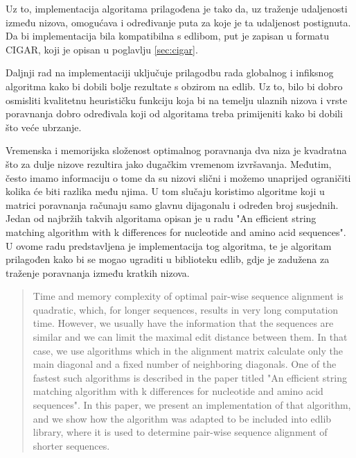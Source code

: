 \documentclass[times, utf8, zavrsni]{fer}
\begin{document}
Uz to, implementacija algoritama prilagođena je tako da, uz traženje udaljenosti između nizova, omogućava i određivanje puta za koje je ta udaljenost postignuta. Da bi implementacija bila kompatibilna s edlibom, put je zapisan u formatu CIGAR, koji je opisan u poglavlju \ref{sec:cigar}.

Daljnji rad na implementaciji uključuje prilagodbu rada globalnog i infiksnog algoritma kako bi dobili bolje rezultate s obzirom na edlib. Uz to, bilo bi dobro osmisliti kvalitetnu heurističku funkciju koja bi na temelju ulaznih nizova i vrste poravnanja dobro određivala koji od algoritama treba primijeniti kako bi dobili što veće ubrzanje.




\begin{sazetak}
Vremenska i memorijska složenost optimalnog poravnanja dva niza je kvadratna što za dulje nizove rezultira jako dugačkim vremenom izvršavanja. Međutim, često imamo informaciju o tome da su nizovi slični i možemo unaprijed ograničiti kolika će biti razlika među njima. U tom slučaju koristimo algoritme koji u matrici poravnanja računaju samo glavnu dijagonalu i određen broj susjednih. Jedan od najbržih takvih algoritama opisan je u radu "An efficient string matching algorithm with k differences for nucleotide and amino acid sequences". U ovome radu predstavljena je implementacija tog algoritma, te je algoritam prilagođen kako bi se mogao ugraditi u biblioteku edlib, gdje je zadužena za traženje poravnanja između kratkih nizova.

\end{sazetak}

\begin{abstract}
Time and memory complexity of optimal pair-wise sequence alignment is quadratic, which, for longer sequences, results in very long computation time. However, we usually have the information that the sequences are similar and we can limit the maximal edit distance between them. In that case, we use algorithms which in the alignment matrix calculate only the main diagonal and a fixed number of neighboring diagonals. One of the fastest such algorithms is described in the paper titled "An efficient string matching algorithm with k differences for nucleotide and amino acid sequences". In this paper, we present an implementation of that algorithm, and we show how the algorithm was adapted to be included into edlib library, where it is used to determine pair-wise sequence alignment of shorter sequences.

\end{abstract}
\end{document}
